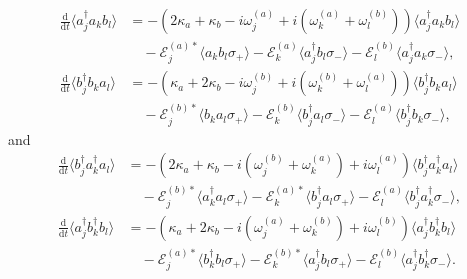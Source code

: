 \documentclass{article}
\newcommand{\ddt}[1][]{\frac{\mathrm{d} #1}{\mathrm{d}t}}
\begin{document}
\begin{subequations}
	\begin{align}
		\ddt \langle a^{\dagger}_{j} a_{k} b_{l} \rangle &= -\left( 2\kappa_{a} + \kappa_{b} - i \omega_{j}^{(a)} + i \left( \omega_{k}^{(a)} + \omega_{l}^{(b)} \right) \right) \langle a^{\dagger}_{j} a_{k} b_{l} \rangle \nonumber \\
		&\quad - \mathcal{E}_{j}^{(a) *} \langle a_{k} b_{l} \sigma_{+} \rangle - \mathcal{E}_{k}^{(a)} \langle a^{\dagger}_{j} b_{l} \sigma_{-} \rangle - \mathcal{E}_{l}^{(b)} \langle a^{\dagger}_{j} a_{k} \sigma_{-} \rangle , \\
		\ddt \langle b^{\dagger}_{j} b_{k} a_{l} \rangle &= -\left( \kappa_{a} + 2\kappa_{b} - i \omega_{j}^{(b)} + i \left( \omega_{k}^{(b)} + \omega_{l}^{(a)} \right) \right) \langle b^{\dagger}_{j} b_{k} a_{l} \rangle \nonumber \\
		&\quad - \mathcal{E}_{j}^{(b) *} \langle b_{k} a_{l} \sigma_{+} \rangle - \mathcal{E}_{k}^{(b)} \langle b^{\dagger}_{j} a_{l} \sigma_{-} \rangle - \mathcal{E}_{l}^{(a)} \langle b^{\dagger}_{j} b_{k} \sigma_{-} \rangle ,
	\end{align}
\end{subequations}
and
\begin{subequations}
	\begin{align}
		\ddt \langle b^{\dagger}_{j} a^{\dagger}_{k} a_{l} \rangle &= -\left( 2\kappa_{a} + \kappa_{b} - i \left( \omega_{j}^{(b)} + \omega_{k}^{(a)} \right) + i \omega_{l}^{(a)} \right) \langle b^{\dagger}_{j} a^{\dagger}_{k} a_{l} \rangle \nonumber \\
		&\quad - \mathcal{E}_{j}^{(b) *} \langle a^{\dagger}_{k} a_{l} \sigma_{+} \rangle - \mathcal{E}_{k}^{(a) *} \langle b^{\dagger}_{j} a_{l} \sigma_{+} \rangle - \mathcal{E}_{l}^{(a)} \langle b^{\dagger}_{j} a^{\dagger}_{k} \sigma_{-} \rangle , \\
		\ddt \langle a^{\dagger}_{j} b^{\dagger}_{k} b_{l} \rangle &= -\left( \kappa_{a} + 2\kappa_{b} - i \left( \omega_{j}^{(a)} + \omega_{k}^{(b)} \right) + i \omega_{l}^{(b)} \right) \langle a^{\dagger}_{j} b^{\dagger}_{k} b_{l} \rangle \nonumber \\
		&\quad - \mathcal{E}_{j}^{(a) *} \langle b^{\dagger}_{k} b_{l} \sigma_{+} \rangle - \mathcal{E}_{k}^{(b) *} \langle a^{\dagger}_{j} b_{l} \sigma_{+} \rangle - \mathcal{E}_{l}^{(b)} \langle a^{\dagger}_{j} b^{\dagger}_{k} \sigma_{-} \rangle .
	\end{align}
\end{subequations}
\end{document}
